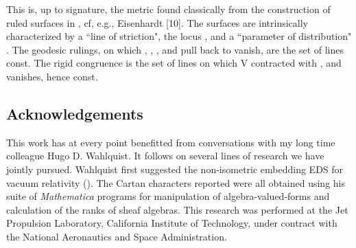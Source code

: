\documentclass[a4paper,a4paper]{article}
\begin{document}
This is,  up to signature,  the metric found classically
from the construction of ruled surfaces in \coordHE{},  cf, e.g.,
Eisenhardt
[10].  The  surfaces are intrinsically characterized by a ``line of
striction",  the locus \coordHE{},  and a ``parameter of
distribution"  \coordHE{}.  The  geodesic rulings,  on which \coordHE{},  \coordHE{},
\coordHE{},  and \coordHE{} pull back
to vanish,  are the set of lines \coordHE{} const.  The rigid congruence is
the set of lines on which V contracted with \coordHE{},  \coordHE{} and \coordHE{} vanishes,  hence \coordHE{} const.

\subsection*{Acknowledgements}

This work has at every point benefitted from conversations with my long
time colleague Hugo D. Wahlquist.  It follows on several lines of
research we have jointly pursued.  Wahlquist first suggested the non-isometric
embedding EDS for vacuum relativity (\coordHE{}).  The Cartan characters
reported were all obtained using his suite of {\itshape Mathematica} programs for
manipulation of algebra-valued-forms and calculation of the ranks of
sheaf algebras.  This research was performed at the Jet Propulsion
Laboratory,  California Institute of Technology,  under contract with
the National Aeronautics and Space Administration.
\end{document}
